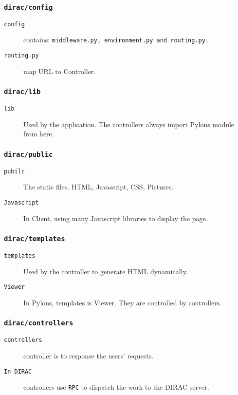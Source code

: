 \documentclass[20pt]{beamer}
\begin{document}
\begin{frame}
    \frametitle{\tt{dirac/config}}
    \begin{description}    
        \item[\tt{config}] contains: \tt{middleware.py},
            \tt{environment.py} and \tt{routing.py}.

        \item[\tt{routing.py}] map URL to Controller.
    \end{description}
\end{frame}


\begin{frame}
    \frametitle{\tt{dirac/lib}}
    \begin{description}    
        \item[\tt{lib}] Used by the application.
            The controllers always import
            Pylons module from here.
    \end{description}
\end{frame}

\begin{frame}
    \frametitle{\tt{dirac/public}}
    \begin{description}    
        \item[\tt{pubilc}] The static files.
            HTML, Javascript, CSS, Pictures.
        \item[\tt{Javascript}] In Client, using many Javascript
            libraries to display the page.
    \end{description}
\end{frame}

\begin{frame}
    \frametitle{\tt{dirac/templates}}
    \begin{description}    
        \item[\tt{templates}] Used by the controller to
            generate HTML dynamically.
        \item[\tt{Viewer}] In Pylons, templates is Viewer.
            They are controlled by controllers.
    \end{description}
\end{frame}

\begin{frame}
    \frametitle{\tt{dirac/controllers}}
    \begin{description}    
        \item[\tt{controllers}] controller is to response the
            users' requests.
        \item[\tt{In DIRAC}] controllers use {\tt RPC} to
            dispatch the work to the DIRAC server.
    \end{description}
\end{frame}
\end{document}
